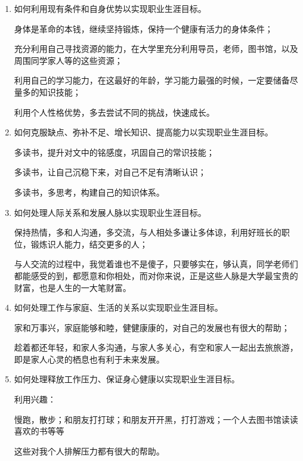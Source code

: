 \documentclass{article}
\begin{document}
\begin{enumerate}[1、]
	\item 如何利用现有条件和自身优势以实现职业生涯目标。\par
	身体是革命的本钱，继续坚持锻炼，保持一个健康有活力的身体条件；\par
	充分利用自己寻找资源的能力，在大学里充分利用导员，老师，图书馆，以及周围同学家人等的这些资源；\par
	利用自己的学习能力，在这最好的年龄，学习能力最强的时候，一定要储备尽量多的知识技能；\par
	利用个人性格优势，多去尝试不同的挑战，快速成长。\par
	
	\item 如何克服缺点、弥补不足、增长知识、提高能力以实现职业生涯目标。\par
	多读书，提升对文中的铭感度，巩固自己的常识技能；\par
	多读书，让自己沉稳下来，对自己不足有清晰认识；\par
	多读书，多思考，构建自己的知识体系。 \par
	
	
	\item 如何处理人际关系和发展人脉以实现职业生涯目标。\par
	保持热情，多和人沟通，多交流，与人相处多谦让多体谅，利用好班长的职位，锻炼识人能力，结交更多的人；\par
	与人交流的过程中，我觉着谁也不是傻子，只要够实在，够认真，同学老师们都能感受的到，都愿意和你相处，而对你来说，正是这些人脉是大学最宝贵的财富，也是人生的一大笔财富。\par
	
	\item 如何处理工作与家庭、生活的关系以实现职业生涯目标。\par
	家和万事兴，家庭能够和睦，健健康康的，对自己的发展也有很大的帮助；\par
	趁着都还年轻，和家人多沟通，与家人多关心，有空和家人一起出去旅旅游，即是家人心灵的栖息也有利于未来发展。\par
	
	\item 如何处理释放工作压力、保证身心健康以实现职业生涯目标。\par
	利用兴趣：\par
	慢跑，散步；和朋友打打球；和朋友开开黑，打打游戏；一个人去图书馆读读喜欢的书等等\par
	这些对我个人排解压力都有很大的帮助。
	
\end{enumerate}
\par 
\end{document}
